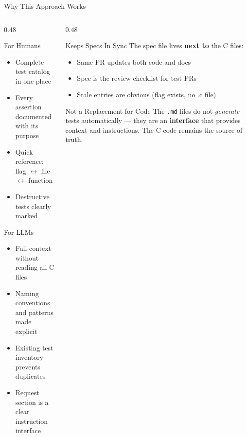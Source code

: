 \documentclass[aspectratio=169, 10pt]{beamer}
\begin{document}
\begin{frame}[fragile]{Why This Approach Works}
\begin{columns}[T]
\begin{column}{0.48\textwidth}
\begin{block}{For Humans}
\begin{itemize}\setlength\itemsep{0.1em}
  \item Complete test catalog in one place
  \item Every assertion documented with its purpose
  \item Quick reference: flag $\leftrightarrow$ file $\leftrightarrow$ function
  \item Destructive tests clearly marked
\end{itemize}
\end{block}

\vspace{0.2em}
\begin{block}{For LLMs}
\begin{itemize}\setlength\itemsep{0.1em}
  \item Full context without reading all C files
  \item Naming conventions and patterns made explicit
  \item Existing test inventory prevents duplicates
  \item Request section is a clear instruction interface
\end{itemize}
\end{block}
\end{column}

\begin{column}{0.48\textwidth}
\begin{block}{Keeps Specs In Sync}
The spec file lives \textbf{next to} the C files:
\begin{itemize}\setlength\itemsep{0.1em}
  \item Same PR updates both code and docs
  \item Spec is the review checklist for test PRs
  \item Stale entries are obvious (flag exists, no .c file)
\end{itemize}
\end{block}

\vspace{0.2em}
\begin{alertblock}{Not a Replacement for Code}
The \texttt{.md} files do not \emph{generate} tests automatically ---
they are an \textbf{interface} that provides context and instructions.
The C code remains the source of truth.
\end{alertblock}
\end{column}
\end{columns}
\end{frame}
\end{document}

